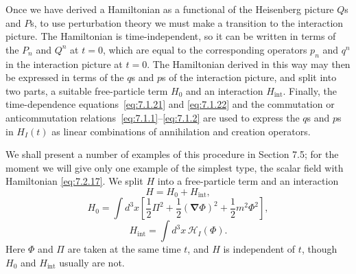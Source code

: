 Once we have derived a Hamiltonian as a functional of the Heisenberg
picture $Q$s and $P$s, to use perturbation theory we must make a transition
to the interaction picture. The Hamiltonian is time-independent, so it can
be written in terms of the $P_n$ and $Q^n$ at $t=0$, which are equal to the
corresponding operators $p_n$ and $q^n$ in the interaction picture at $t=0$.
The Hamiltonian derived in this way may then be expressed in terms of the
$q$s and $p$s of the interaction picture, and split into two parts, a suitable
free-particle term $H_0$ and an interaction $H_{\mathrm{int}}$. Finally, the
time-dependence equations~\eqref{eq:7.1.21} and \eqref{eq:7.1.22} and the commutation or
anticommutation relations~\eqref{eq:7.1.1}--\eqref{eq:7.1.2} are used to express the $q$s and $p$s
in $H_I(t)$ as linear combinations of annihilation and creation operators.

We shall present a number of examples of this procedure in Section
7.5; for the moment we will give only one example of the simplest type,
the scalar field with Hamiltonian \eqref{eq:7.2.17}. We split $H$ into a free-particle
term and an interaction
\begin{equation}
H=H_0+H_{\mathrm{int}},
\tag{7.2.21}\label{eq:7.2.21}
\end{equation}
\begin{equation}
H_0=\int d^3x\left[\frac12\Pi^2+\frac12(\boldsymbol{\nabla}\Phi)^2
+\frac12m^2\Phi^2\right],
\tag{7.2.22}\label{eq:7.2.22}
\end{equation}
\begin{equation}
H_{\mathrm{int}}=\int d^3x\,\mathcal{H}_I(\Phi).
\tag{7.2.23}\label{eq:7.2.23}
\end{equation}
Here $\Phi$ and $\Pi$ are taken at the same time $t$, and $H$ is independent of
$t$, though $H_0$ and $H_{\mathrm{int}}$ usually are not.

